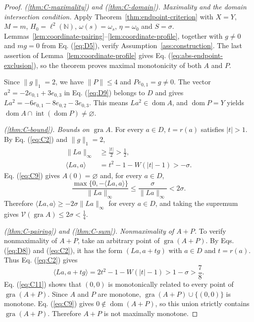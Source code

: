 \documentclass[11pt]{article}
\newcommand{\N}{\mathbb N}
\newcommand{\gra}{\operatorname{gra}}
\newcommand{\dom}{\operatorname{dom}}
\newcommand{\pair}[2]{\langle #1,#2\rangle}
\theoremstyle{definition}
\theoremstyle{remark}
\begin{document}
\begin{proof}
\noindent\textit{\textup{(\ref{thm:C-maximality})} and \textup{(\ref{thm:C-domain})}. Maximality and the domain intersection condition.}
Apply Theorem~\ref{thm:endpoint-criterion} with $X=Y$, $M=m$, $H_0=\ell^2(\N)$, $\omega(s)=\omega_s$, $\eta=\omega_0$ and $S=\sigma$. Lemmas~\ref{lem:coordinate-pairing}--\ref{lem:coordinate-profile}, together with $g\ne0$ and $mg=0$ from Eq. (\ref{eq:D5}), verify Assumption~\ref{ass:construction}. The last assertion of Lemma~\ref{lem:coordinate-profile} gives Eq. (\ref{eq:abs-endpoint-exclusion}), so the theorem proves maximal monotonicity of both $A$ and $P$. 

\label{sec:C6}
Since $\|g\|_1=2$, we have $\|P\|\le4$ and $Pe_{0,1}=g\ne0$. The vector $a^2=-2e_{0,1}+3e_{0,3}$ in Eq. (\ref{eq:D9}) belongs to $D$ and gives $La^2=-6e_{0,1}-8e_{0,2}-3e_{0,3}$. This means $La^2\in\dom A$, and $\dom P=Y$ yields $\dom A\cap\operatorname{int}(\dom P)\ne\varnothing$.

\noindent\textit{\textup{(\ref{thm:C-bound})}. Bounds on $\gra A$.}
\label{sec:C5}
For every $a\in D$, $t=r(a)$ satisfies $|t|>1$. By Eq. (\ref{eq:C2}) and $\|g\|_1=2$,
\begin{equation}
\begin{aligned}
\|La\|_\infty&\ge\frac{|t|}{2}>\frac{1}{2},\\
\pair{La}{a}&=t^2-1-W(|t|-1)>-\sigma.
\end{aligned}
\label{eq:C9}
\end{equation}
Eq. (\ref{eq:C9}) gives $A(0)=\varnothing$ and, for every $a\in D$,
\[
\frac{\max\{0,-\pair{La}{a}\}}{\|La\|_\infty}
\le \frac{\sigma}{\|La\|_\infty}
<2\sigma.
\]
Therefore $\pair{La}{a}\ge-2\sigma\|La\|_\infty$ for every $a\in D$, and taking the supremum gives $\mathcal V(\gra A)\le2\sigma<\frac{1}{4}$.

\noindent\textit{\textup{(\ref{thm:C-pairing})} and \textup{(\ref{thm:C-sum})}. Nonmaximality of $A+P$.}
To verify nonmaximality of $A+P$, take an arbitrary point of $\gra(A+P)$. By Eqs. (\ref{eq:D8}) and (\ref{eq:C2}), it has the form $(La,a+tg)$ with $a\in D$ and $t=r(a)$. Thus Eq. (\ref{eq:C2}) gives
\begin{equation}
\pair{La}{a+tg}=2t^2-1-W(|t|-1)>1-\sigma>\frac{7}{8}.
\label{eq:C11}
\end{equation}
Eq. (\ref{eq:C11}) shows that $(0,0)$ is monotonically related to every point of $\gra(A+P)$. Since $A$ and $P$ are monotone, $\gra(A+P)\cup\{(0,0)\}$ is monotone. Eq. (\ref{eq:C9}) gives $0\notin\dom(A+P)$, so this union strictly contains $\gra(A+P)$. Therefore $A+P$ is not maximally monotone.
\end{proof}
\end{document}
